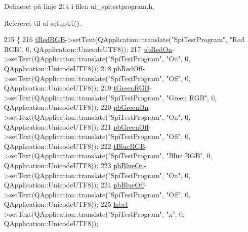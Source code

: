 Defineret på linje 214 i filen ui\+\_\+spitestprogram.\+h.



Refereret til af setup\+Ui().


\begin{DoxyCode}
215     \{
216         \hyperlink{class_ui___spi_test_program_a44f9277d36451995887541d6e333c772}{tRedRGB}->setText(QApplication::translate(\textcolor{stringliteral}{"SpiTestProgram"}, \textcolor{stringliteral}{"Red RGB"}, 0, 
      QApplication::UnicodeUTF8));
217         \hyperlink{class_ui___spi_test_program_a58972344360380ab7a3cedec6de9fb0d}{pbRedOn}->setText(QApplication::translate(\textcolor{stringliteral}{"SpiTestProgram"}, \textcolor{stringliteral}{"On"}, 0, 
      QApplication::UnicodeUTF8));
218         \hyperlink{class_ui___spi_test_program_ad6661caed9d7154252ff188ea62e538c}{pbRedOff}->setText(QApplication::translate(\textcolor{stringliteral}{"SpiTestProgram"}, \textcolor{stringliteral}{"Off"}, 0, 
      QApplication::UnicodeUTF8));
219         \hyperlink{class_ui___spi_test_program_a56e39ae0021a6fba651282c09e6d38da}{tGreenRGB}->setText(QApplication::translate(\textcolor{stringliteral}{"SpiTestProgram"}, \textcolor{stringliteral}{"Green RGB"}, 0, 
      QApplication::UnicodeUTF8));
220         \hyperlink{class_ui___spi_test_program_aa00d405e11fadc9dd8d0b7aae2632903}{pbGreenOn}->setText(QApplication::translate(\textcolor{stringliteral}{"SpiTestProgram"}, \textcolor{stringliteral}{"On"}, 0, 
      QApplication::UnicodeUTF8));
221         \hyperlink{class_ui___spi_test_program_ad4aa6f2ff845832ee96f6158c85bbfba}{pbGreenOff}->setText(QApplication::translate(\textcolor{stringliteral}{"SpiTestProgram"}, \textcolor{stringliteral}{"Off"}, 0, 
      QApplication::UnicodeUTF8));
222         \hyperlink{class_ui___spi_test_program_a24f37f517fcdcba9802de32d4cb7cd2a}{tBlueRGB}->setText(QApplication::translate(\textcolor{stringliteral}{"SpiTestProgram"}, \textcolor{stringliteral}{"Blue RGB"}, 0, 
      QApplication::UnicodeUTF8));
223         \hyperlink{class_ui___spi_test_program_a3f13697eb9ebac3370cf5b1456bb2ab6}{pbBlueOn}->setText(QApplication::translate(\textcolor{stringliteral}{"SpiTestProgram"}, \textcolor{stringliteral}{"On"}, 0, 
      QApplication::UnicodeUTF8));
224         \hyperlink{class_ui___spi_test_program_add50c8a20a19c966af33418b767fb815}{pbBlueOff}->setText(QApplication::translate(\textcolor{stringliteral}{"SpiTestProgram"}, \textcolor{stringliteral}{"Off"}, 0, 
      QApplication::UnicodeUTF8));
225         \hyperlink{class_ui___spi_test_program_a22925632964060df176ccbc0de5fa511}{label}->setText(QApplication::translate(\textcolor{stringliteral}{"SpiTestProgram"}, \textcolor{stringliteral}{"x"}, 0, QApplication::UnicodeUTF8));

\end{DoxyCode}
